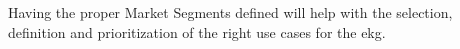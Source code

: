 %
%
Having the proper Market Segments defined will help with the selection, definition and prioritization of
the right use cases for the \gls{ekg}.
